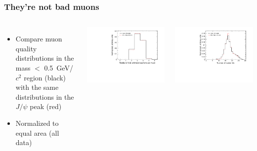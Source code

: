 \documentclass[compress]{beamer}
\begin{document}
\begin{frame}
\frametitle{They're not bad muons}

\begin{columns}
\begin{itemize}
\item Compare muon quality distributions in the mass $<$ 0.5~GeV/$c^2$
  region (black) with the same distributions in the $J/\psi$ peak
  (red)
\item Normalized to equal area (all data)
\end{itemize}

\includegraphics[width=\linewidth]{lowmassquality_matches.pdf}

\includegraphics[width=\linewidth]{lowmassquality_hits.pdf}


\end{columns}
\end{frame}
\end{document}
